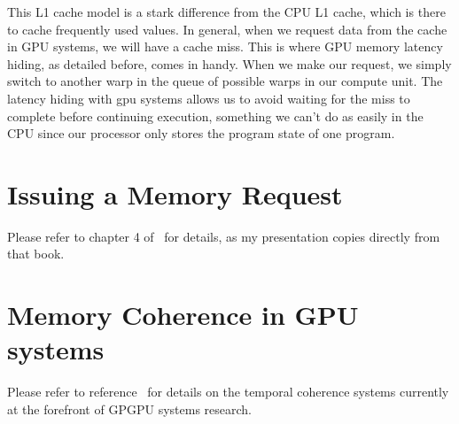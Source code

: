 This L1 cache model is a stark difference from the CPU L1 cache, which is there to cache frequently used values. In general, when we request data from the cache in GPU systems, we will have a cache miss. This is where GPU memory latency hiding, as detailed before, comes in handy. When we make our request, we simply switch to another warp in the queue of possible warps in our compute unit. The latency hiding with gpu systems allows us to avoid waiting for the miss to complete before continuing execution, something we can't do as easily in the CPU since our processor only stores the program state of one program.

\chapter{Issuing a Memory Request}

Please refer to chapter 4 of~\cite{GPGPUbook} for details, as my presentation copies directly from that book.

\chapter{Memory Coherence in GPU systems}

Please refer to reference~\cite{temporalcoherence} for details on the temporal coherence systems currently at the forefront of GPGPU systems research.
